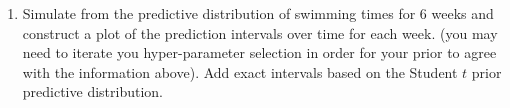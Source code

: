\documentclass{article}
\begin{document}
\begin{enumerate}
\begin{enumerate}
  \item Simulate from the predictive distribution of swimming
  times for 6 weeks and construct a plot of the prediction intervals
  over time for each week.   (you may need to iterate you hyper-parameter
  selection in order for your prior to agree with the information
  above).  Add exact intervals based on the Student $t$ prior
  predictive distribution.  
   \end{enumerate}
\end{enumerate}
\end{document}
